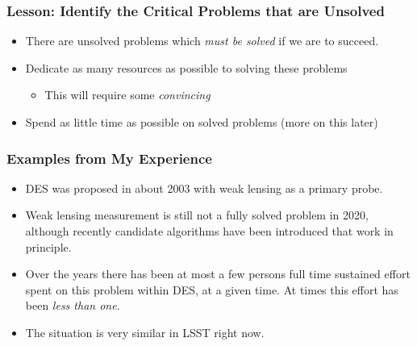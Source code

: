 \documentclass{beamer}
\begin{document}
\frame
{
    \frametitle{Lesson: Identify the Critical Problems that are Unsolved}

    \begin{itemize}

        \item There are unsolved problems which {\em must be solved} if we are to succeed.

        \item Dedicate as many resources as possible to solving these problems

            \begin{itemize}
                \item This will require some {\em convincing}
            \end{itemize}

        \item Spend as little time as possible on solved problems (more on this later)

    \end{itemize}

}

\frame
{
    \frametitle{Examples from My Experience}


    \begin{itemize}

        \item DES was proposed in about 2003 with weak lensing as a primary probe.

        \item Weak lensing measurement is still not a fully solved problem in
            2020, although recently candidate algorithms have been introduced
            that work in principle.


        \item  Over the years there has been at most a few persons full time
            sustained effort spent on this problem within DES, at a given time.
            At times this effort has been {\em less than one}.

        \item The situation is very similar in LSST right now.

    \end{itemize}

}
\end{document}
